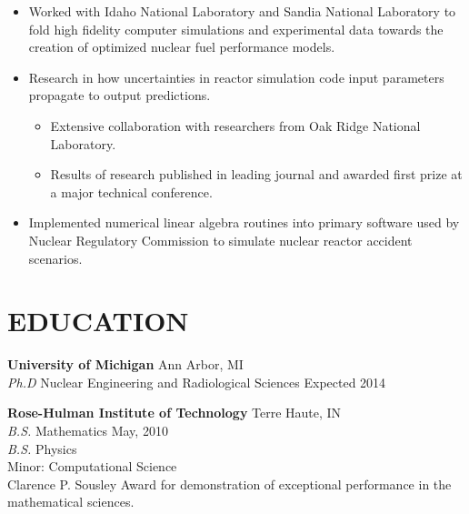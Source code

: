 \documentclass[margin, 10pt]{res} %
\begin{document}
\begin{resume}
\begin{itemize} \itemsep -2pt %
\item Worked with Idaho National Laboratory and Sandia National Laboratory to fold high fidelity computer simulations and experimental data towards the creation of optimized nuclear fuel performance models. 
\item Research in how uncertainties in reactor simulation code input parameters propagate to output predictions.
\begin{itemize}
\item Extensive collaboration with researchers from Oak Ridge National Laboratory.
\item Results of research published in leading journal and awarded first prize at a major technical conference.
\end{itemize}
\item Implemented numerical linear algebra routines into primary software used by Nuclear Regulatory Commission to simulate nuclear reactor accident scenarios.
\end{itemize}




\section{EDUCATION}

\textbf{University of Michigan} \hfill Ann Arbor, MI \\
{\sl Ph.D} Nuclear Engineering and Radiological Sciences \hfill Expected 2014

\textbf{Rose-Hulman Institute of Technology} \hfill Terre Haute, IN \\
{\sl B.S.} Mathematics \hfill May, 2010 \\
{\sl B.S.} Physics \\
Minor: Computational Science \\
Clarence P. Sousley Award for demonstration of exceptional performance in the mathematical sciences.
  
\end{resume}
\end{document}
